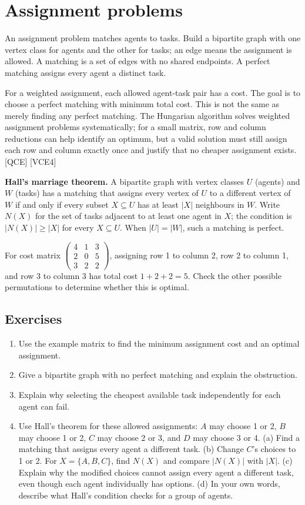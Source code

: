 \chapter{Assignment problems}
An assignment problem matches agents to tasks. Build a bipartite graph with one vertex class for agents and the other for tasks; an edge means the assignment is allowed. A matching is a set of edges with no shared endpoints. A perfect matching assigns every agent a distinct task.

For a weighted assignment, each allowed agent-task pair has a cost. The goal is to choose a perfect matching with minimum total cost. This is not the same as merely finding any perfect matching. The Hungarian algorithm solves weighted assignment problems systematically; for a small matrix, row and column reductions can help identify an optimum, but a valid solution must still assign each row and column exactly once and justify that no cheaper assignment exists. [QCE] [VCE4]

\Enrichment{} \textbf{Hall's marriage theorem.} A bipartite graph with vertex classes $U$ (agents) and $W$ (tasks) has a matching that assigns every vertex of $U$ to a different vertex of $W$ if and only if every subset $X\subseteq U$ has at least $|X|$ neighbours in $W$. Write $N(X)$ for the set of tasks adjacent to at least one agent in $X$; the condition is $|N(X)|\geq |X|$ for every $X\subseteq U$. When $|U|=|W|$, such a matching is perfect.

\begin{example}
For cost matrix $\begin{pmatrix}4&1&3\\2&0&5\\3&2&2\end{pmatrix}$, assigning row 1 to column 2, row 2 to column 1, and row 3 to column 3 has total cost $1+2+2=5$. Check the other possible permutations to determine whether this is optimal.
\end{example}

\section*{Exercises}
\begin{enumerate}
\item Use the example matrix to find the minimum assignment cost and an optimal assignment.
\item Give a bipartite graph with no perfect matching and explain the obstruction.
\item Explain why selecting the cheapest available task independently for each agent can fail.
\item \Enrichment{} Use Hall's theorem for these allowed assignments: $A$ may choose 1 or 2, $B$ may choose 1 or 2, $C$ may choose 2 or 3, and $D$ may choose 3 or 4. (a) Find a matching that assigns every agent a different task. (b) Change $C$'s choices to 1 or 2. For $X=\{A,B,C\}$, find $N(X)$ and compare $|N(X)|$ with $|X|$. (c) Explain why the modified choices cannot assign every agent a different task, even though each agent individually has options. (d) In your own words, describe what Hall's condition checks for a group of agents.
\end{enumerate}

